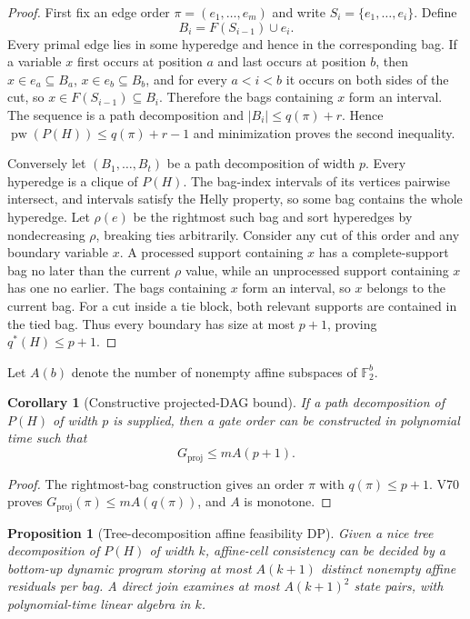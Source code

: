 \documentclass[11pt]{article}
\newtheorem{corollary}{Corollary}
\newtheorem{proposition}{Proposition}
\newcommand{\pw}{\operatorname{pw}}
\begin{document}
\begin{proof}
First fix an edge order $\pi=(e_1,\ldots,e_m)$ and write $S_i=\{e_1,\ldots,e_i\}$.  Define
\[
  B_i=F(S_{i-1})\cup e_i.
\]
Every primal edge lies in some hyperedge and hence in the corresponding bag.  If a variable $x$ first occurs at position $a$ and last occurs at position $b$, then $x\in e_a\subseteq B_a$, $x\in e_b\subseteq B_b$, and for every $a<i<b$ it occurs on both sides of the cut, so $x\in F(S_{i-1})\subseteq B_i$.  Therefore the bags containing $x$ form an interval.  The sequence is a path decomposition and $|B_i|\le q(\pi)+r$.  Hence $\pw(P(H))\le q(\pi)+r-1$ and minimization proves the second inequality.

Conversely let $(B_1,\ldots,B_t)$ be a path decomposition of width $p$.  Every hyperedge is a clique of $P(H)$.  The bag-index intervals of its vertices pairwise intersect, and intervals satisfy the Helly property, so some bag contains the whole hyperedge.  Let $\rho(e)$ be the rightmost such bag and sort hyperedges by nondecreasing $\rho$, breaking ties arbitrarily.  Consider any cut of this order and any boundary variable $x$.  A processed support containing $x$ has a complete-support bag no later than the current $\rho$ value, while an unprocessed support containing $x$ has one no earlier.  The bags containing $x$ form an interval, so $x$ belongs to the current bag.  For a cut inside a tie block, both relevant supports are contained in the tied bag.  Thus every boundary has size at most $p+1$, proving $q^*(H)\le p+1$.
\end{proof}

Let $A(b)$ denote the number of nonempty affine subspaces of $\mathbb F_2^b$.

\begin{corollary}[Constructive projected-DAG bound]
If a path decomposition of $P(H)$ of width $p$ is supplied, then a gate order can be constructed in polynomial time such that
\[
  G_{\mathrm{proj}}\le m A(p+1).
\]
\end{corollary}

\begin{proof}
The rightmost-bag construction gives an order $\pi$ with $q(\pi)\le p+1$.  V70 proves $G_{\mathrm{proj}}(\pi)\le mA(q(\pi))$, and $A$ is monotone.
\end{proof}

\begin{proposition}[Tree-decomposition affine feasibility DP]
Given a nice tree decomposition of $P(H)$ of width $k$, affine-cell consistency can be decided by a bottom-up dynamic program storing at most $A(k+1)$ distinct nonempty affine residuals per bag.  A direct join examines at most $A(k+1)^2$ state pairs, with polynomial-time linear algebra in $k$.
\end{proposition}
\end{document}
